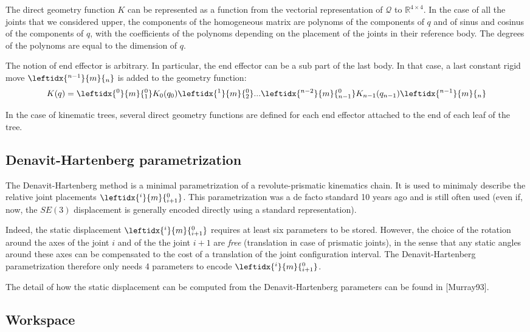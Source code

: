 \documentclass{book}
\begin{document}
The direct geometry function $K$ can be represented as a function from the vectorial representation of $\mathcal{Q}$ to $\mathbb{R}^{4\times4}$.
In the case of all the joints that we considered upper, the components of the homogeneous matrix are polynoms of the components of $q$ and of sinus and cosinus of the components of $q$, with the coefficients of the polynoms depending on the placement of the joints in their reference body. The degrees of the polynoms are equal to the dimension of $q$.

The notion of end effector is arbitrary. In particular, the end effector can be a sub part of the last body. In that case, a last constant rigid move $\leftidx{^{n-1}}{m}{_n}$ is added to the geometry function:
\[ K(q) =  \leftidx{^0}{m}{_{1}^0} K_0(q_0) \leftidx{^1}{m}{_{2}^0} ...   \leftidx{^{n-2}}{m}{_{n-1}^0} K_{n-1}(q_{n-1}) \leftidx{^{n-1}}{m}{_n} \]

In the case of kinematic trees, several direct geometry functions are defined for each end effector attached to the end of each leaf of the tree.

\subsection{Denavit-Hartenberg parametrization}

The Denavit-Hartenberg method is a minimal parametrization of a revolute-prismatic kinematics chain. It is used to minimaly describe the relative joint placements $\leftidx{^{i}}{m}{_{i+1}^0}$. This parametrization was a de facto standard 10 years ago and is still often used (even if, now, the $SE(3)$ displacement is generally encoded directly using a standard representation).

Indeed, the static displacement $\leftidx{^{i}}{m}{_{i+1}^0}$ requires at least six parameters to be stored. However, the choice of the rotation around the axes of the joint $i$ and of the the joint $i+1$ are \emph{free} (translation in case of prismatic joints), in the sense that any static angles around these axes can be compensated to the cost of a translation of the joint configuration interval. The Denavit-Hartenberg parametrization therefore only needs 4 parameters to encode $\leftidx{^{i}}{m}{_{i+1}^0}$. 

The detail of how the static displacement can be computed from the Denavit-Hartenberg parameters can be found in [Murray93].

\subsection{Workspace}
\end{document}

